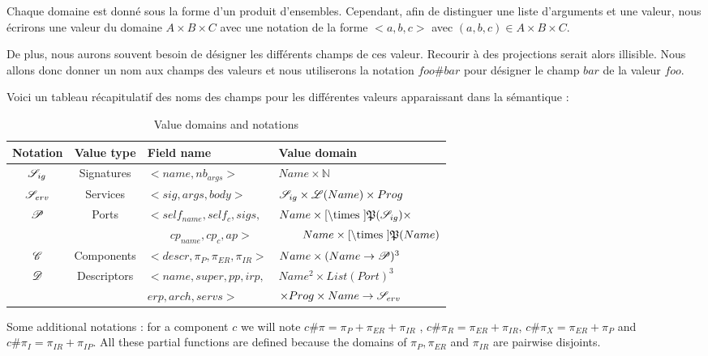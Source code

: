 \begin{appendices}
Chaque domaine est donné sous la forme d'un produit d'ensembles. Cependant, afin de distinguer une liste d'arguments et une valeur, nous écrirons une valeur du domaine $A\times B\times C$ avec une notation de la forme $<a,b,c>$ avec $(a,b,c)\in A\times B \times C$.

De plus, nous aurons souvent besoin de désigner les différents champs de ces valeur. Recourir à des projections serait alors illisible. Nous allons donc donner un nom aux champs des valeurs et nous utiliserons la notation $foo\#bar$ pour désigner le champ $bar$ de la valeur $foo$. 

Voici un tableau récapitulatif des noms des champs pour les différentes valeurs apparaissant dans la sémantique :

\begin{table}[!ht]
\begin{center}
\begin{tabular}{|c|c|l|l|}

\hline
Notation & Value type & Field name & Value domain\\
\hline
 $\mathcal{S}_{ig}$  &  Signatures & $<name,nb_{args}>$ &$Name \times \mathbb{N}$\\
 $\mathcal{S}_{erv}$ & Services & $<sig,args,body>$ &$\mathcal{S}_{ig} \times \mathcal{L}(Name) \times Prog$ \\
 $\mathcal{P}$ & Ports  & $<self_{name}, self_c,sigs,$ & $Name \times \Cref \times \mathfrak{P}(\Sig)\times $ \\
 &&$\qquad cp_{name},cp_{c},ap>$&$\qquad Name \times \Cref \times \mathfrak{P}(Name)$\\
 $\mathcal{C}$ & Components & $<descr,\pi_P,\pi_{ER},\pi_{IR}>$ &$Name \times(Name \rightarrow \mathcal{P})^3 $\\
 $\mathcal{D}$ &  Descriptors &$<name,super,pp,irp,$ &$Name^2 \times List(Port)^3$ \\
&&\qquad $erp,arch,servs>$&\qquad $\times Prog \times Name \rightarrow \mathcal{S}_{erv}$\\
\hline
\end{tabular}
\end{center}
\label{tab:DomValNotation}
\caption{Value domains and notations}
\end{table}

Some additional notations : for a component $c$ we will note $c\#\pi = \pi_P + \pi_{ER} + \pi_{IR}$ ,  $c\#\pi_R = \pi_{ER}+\pi_{IR}$,  $c\#\pi_X = \pi_{ER}+\pi_{P}$ and  $c\#\pi_I = \pi_{IR}+\pi_{IP}$. All these partial functions are defined because the domains of $\pi_P, \pi_{ER}$ and $\pi_{IR}$ are pairwise disjoints.


\end{appendices}
